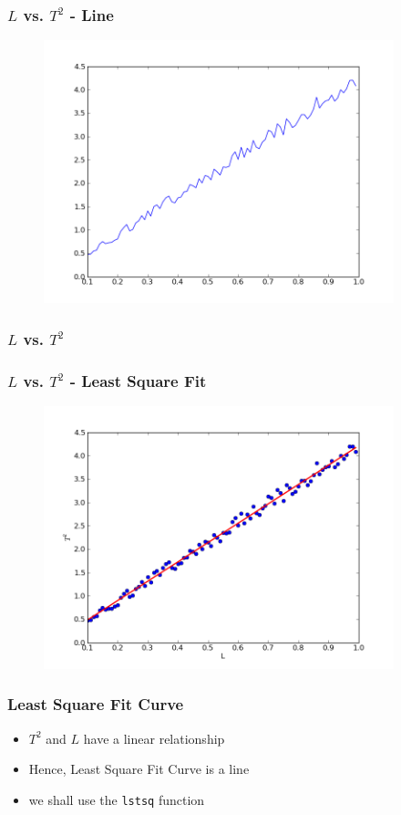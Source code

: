 \documentclass[14pt,compress]{beamer}
\newcommand{\typ}[1]{\lstinline{#1}}
\begin{document}
\begin{frame}[fragile]
\frametitle{$L$ vs. $T^2$ - Line}
\vspace{-0.15in}
\begin{figure}
\includegraphics[width=4in]{data/L-Tsq-Line}
\end{figure}
\end{frame}

\begin{frame}[fragile]
\frametitle{$L$ vs. $T^2$ }
\frametitle{$L$ vs. $T^2$ - Least Square Fit}
\vspace{-0.15in}
\begin{figure}
\includegraphics[width=4in]{data/least-sq-fit}
\end{figure}
\end{frame}

\begin{frame}
\frametitle{Least Square Fit Curve}
\begin{itemize}
\item $T^2$ and $L$ have a linear relationship
\item Hence, Least Square Fit Curve is a line
\item we shall use the \typ{lstsq} function
\end{itemize}
\end{frame}
\end{document}
